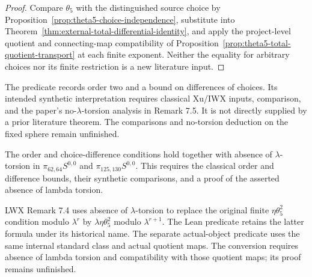 \begin{proof}
  Compare $\theta_5$ with the distinguished source choice by
  Proposition~\ref{prop:theta5-choice-independence}, substitute into
  Theorem~\ref{thm:external-total-differential-identity}, and apply the
  project-level quotient and connecting-map compatibility of
  Proposition~\ref{prop:theta5-total-quotient-transport} at each finite
  exponent.  Neither the equality for arbitrary choices nor its finite
  restriction is a new literature input.
\end{proof}

\begin{proposition}
  \label{thm:external-theta5-order-data}
  \notready
  The predicate records order two and a bound on differences of choices.
  Its intended synthetic interpretation requires classical Xu/IWX inputs,
  comparison, and the paper's no-$\lambda$-torsion analysis in Remark 7.5.
  It is not directly supplied by a prior literature theorem.
  The comparisons and no-torsion deduction on the fixed sphere remain
  unfinished.
\end{proposition}

\begin{proposition}
  \label{evidence:theta5-order-torsion}
  \notready
  The order and choice-difference conditions hold together with absence of
  $\lambda$-torsion in $\pi_{62,64}S^{0,0}$ and $\pi_{125,130}S^{0,0}$.
  This requires the classical order and difference bounds, their synthetic
  comparisons, and a proof of the asserted absence of lambda torsion.
\end{proposition}

\begin{proposition}
  \label{prop:bjm-bx-normalized-criterion}
  \notready
  LWX Remark 7.4 uses absence of $\lambda$-torsion to replace the original
  finite $\eta\theta_5^2$ condition modulo $\lambda^r$ by
  $\lambda\eta\theta_5^2$ modulo $\lambda^{r+1}$.
  The Lean predicate retains the latter formula under its historical name.
  The separate actual-object predicate uses the same internal standard class
  and actual quotient maps. The conversion requires absence of lambda
  torsion and compatibility with those quotient maps; its proof remains
  unfinished.
\end{proposition}

